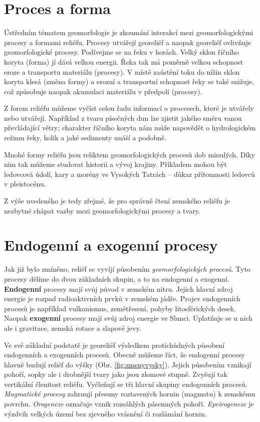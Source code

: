 \section{Proces a forma}
Ústředním tématem geomorfologie je zkoumání interakcí mezi geomorfologickými procesy a formami reliéfu. Procesy utvářejí georeliéf a naopak georeliéf ovlivňuje geomorfologické procesy. Podívejme se na řeku v horách. Velký sklon říčního koryta (forma) jí dává velkou energii. Řeka tak má poměrně velkou schopnost eroze a transportu materiálu (procesy). V místě zaústění toku do nížin sklon koryta klesá (změna formy) a erozní a transportní schopnost řeky se také snižuje, což způsobuje naopak akumulaci materiálu v předpolí (procesy).

Z forem reliéfu můžeme vyčíst celou řadu informací o procesech, které je utvářely nebo utvářejí. Například z tvaru písečných dun lze zjistit jakého směru vanou převládající větry; charakter říčního koryta nám může napovědět o hydrologickém režimu řeky, kolik a jaké sedimenty unáší a podobně. 

Mnohé formy reliéfu jsou reliktem geomorfologických procesů dob minulých. Díky nim tak můžeme studovat historii a vývoj krajiny. Příkladem mohou být ledovcová údolí, kary a morény ve Vysokých Tatrách -- důkaz přítomnosti ledovců v pleistocénu.

Z výše uvedeného je tedy zřejmé, že pro správně čtení zemského reliéfu je nezbytné chápat vazby mezi geomorfologickými procesy a tvary.

\section{Endogenní a exogenní procesy}
Jak již bylo zmíněno, reliéf se vyvíjí působením \emph{geomorfologických procesů}. Tyto procesy dělíme do dvou základních skupin, a to na endogenní a exogenní. \textbf{Endogenní} procesy mají svůj původ v zemském nitru. Jejich hlavní zdroj energie je rozpad radioaktivních prvků v zemském jádře. Projev endogenních procesů je například vulkanismus, zemětřesení, pohyby litosférických desek. Naopak \textbf{exogenní} procesy mají svůj zdroj energie ve Slunci. Uplatňuje se u nich ale i gravitace, zemská rotace a slapové jevy. 

Ve své základní podstatě je georeliéf výsledkem protichůdných působení endogenních a exogenních procesů. Obecně můžeme říct, že endogenní procesy hlavně budují reliéf do výšky (Obr. \ref{fig:zmenyvysky}). Jejich působením vznikají pohoří, sopky ale i drobnější tvary jako jsou zlomové stupně. Zvyšují tak vertikální členitost reliéfu. Vyčleňují se tři hlavní skupiny endogenních procesů. \emph{Magmatické procesy} zahrnují přesuny roztavených hornin (magmatu) k zemskému povrchu. \emph{Orogeneze} označuje vznik rozsáhlých pásemných pohoří. \emph{Epeirogeneze} je výzdvih velkých území bez zjevného vrásnění či rozlámání hornin. 

